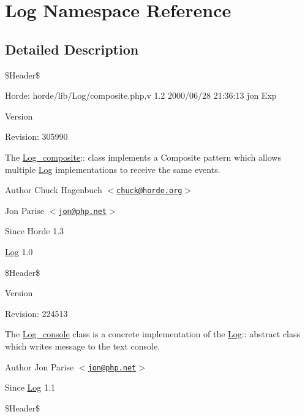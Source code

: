 \hypertarget{namespace_log}{
\section{Log Namespace Reference}
\label{namespace_log}
}


\subsection{Detailed Description}
\$Header\$ \begin{DoxyParagraph}{Horde:}
horde/lib/Log/composite.php,v 1.2 2000/06/28 21:36:13 jon Exp 
\end{DoxyParagraph}


\begin{DoxyVersion}{Version}

\end{DoxyVersion}
\begin{DoxyParagraph}{Revision:}
305990 
\end{DoxyParagraph}


The \hyperlink{class_log__composite}{Log\_\-composite}:: class implements a Composite pattern which allows multiple \hyperlink{class_log}{Log} implementations to receive the same events.

\begin{DoxyAuthor}{Author}
Chuck Hagenbuch $<$\href{mailto:chuck@horde.org}{\tt chuck@horde.org}$>$ 

Jon Parise $<$\href{mailto:jon@php.net}{\tt jon@php.net}$>$
\end{DoxyAuthor}
\begin{DoxySince}{Since}
Horde 1.3 

\hyperlink{class_log}{Log} 1.0
\end{DoxySince}
\$Header\$

\begin{DoxyVersion}{Version}

\end{DoxyVersion}
\begin{DoxyParagraph}{Revision:}
224513 
\end{DoxyParagraph}


The \hyperlink{class_log__console}{Log\_\-console} class is a concrete implementation of the \hyperlink{class_log}{Log}:: abstract class which writes message to the text console.

\begin{DoxyAuthor}{Author}
Jon Parise $<$\href{mailto:jon@php.net}{\tt jon@php.net}$>$ 
\end{DoxyAuthor}
\begin{DoxySince}{Since}
\hyperlink{class_log}{Log} 1.1
\end{DoxySince}
\$Header\$

